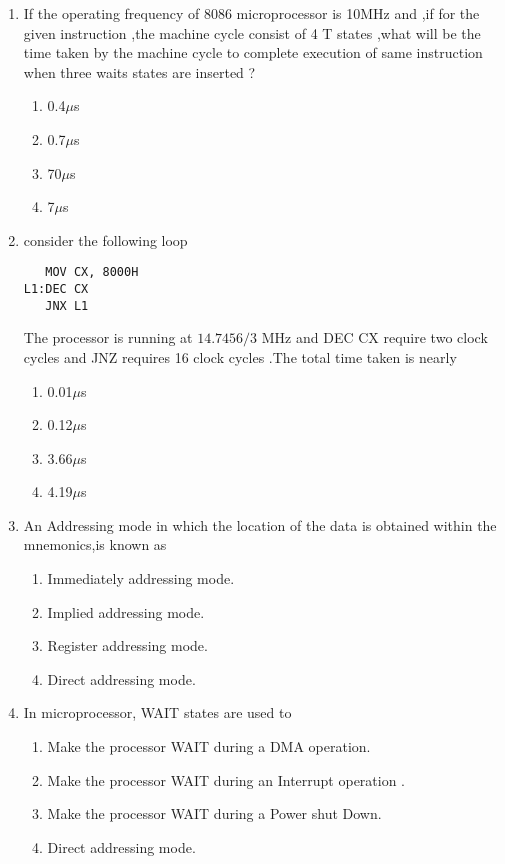 \documentclass[journal,12pt,twocolumn]{IEEEtran}
\begin{document}
\begin{enumerate}
%

\item If the operating frequency of 8086 microprocessor is 10MHz and ,if for the given instruction ,the machine cycle consist of 4 T states ,what will be the time taken by the machine cycle to complete execution of same instruction when three waits states are inserted ?\\  
%

\begin{enumerate}
\item 0.4$\mu$s
\item 0.7$\mu$s
\item 70$\mu$s
\item 7$\mu$s
\end{enumerate}
\item consider the following loop\\
\begin{verbatim}
   MOV CX, 8000H
L1:DEC CX
   JNX L1
\end{verbatim}
The processor is running at $14.7456/3$ MHz and DEC CX require two clock cycles and JNZ requires 16 clock cycles .The total time taken is nearly \\
\begin{enumerate}
\item 0.01$\mu$s
\item 0.12$\mu$s
\item 3.66$\mu$s
\item 4.19$\mu$s
\end{enumerate}
\item An Addressing mode in which the location of the data is obtained within the mnemonics,is known as 
  \begin{enumerate}
\item Immediately addressing mode.
\item Implied addressing mode.
\item Register addressing mode.
\item Direct addressing mode.
\end{enumerate}                 
\item In microprocessor, WAIT states are used to 
  \begin{enumerate}
\item Make the processor WAIT during a DMA operation.
\item Make the processor WAIT during an Interrupt operation .
\item Make the processor WAIT during a Power shut Down.
\item Direct addressing mode.
\end{enumerate}              

 \end{enumerate}
  
\end{document}
